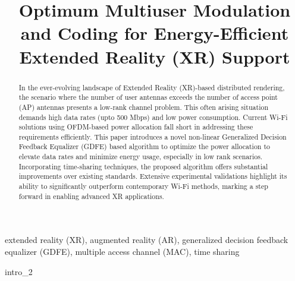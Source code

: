 \documentclass[conference]{IEEEtran}
\begin{document}
\title{Optimum Multiuser Modulation and Coding for Energy-Efficient Extended Reality (XR) Support\\
}

\author{



}

\maketitle
\vspace{-40pt}

\begin{abstract}
In the ever-evolving landscape of Extended Reality (XR)-based distributed rendering, the scenario where the number of user antennas exceeds the number of access point (AP) antennas presents a low-rank channel problem. This often arising situation demands high data rates (upto 500 Mbps) and low power consumption. Current Wi-Fi solutions using OFDM-based power allocation fall short in addressing these requirements efficiently. This paper introduces a novel non-linear Generalized Decision Feedback Equalizer (GDFE) based algorithm to optimize the power allocation to elevate data rates and minimize energy usage,  especially in low rank scenarios. Incorporating time-sharing techniques, the proposed algorithm offers substantial improvements over existing standards. Extensive experimental validations highlight its ability to significantly outperform contemporary Wi-Fi methods, marking a step forward in enabling advanced XR applications.
\end{abstract}

\begin{IEEEkeywords}
extended reality (XR), augmented reality (AR), generalized decision feedback equalizer (GDFE), multiple access channel (MAC), time sharing
\end{IEEEkeywords}

% 
 {intro_2}

% 


% 
% 






\footnotesize


\end{document}
